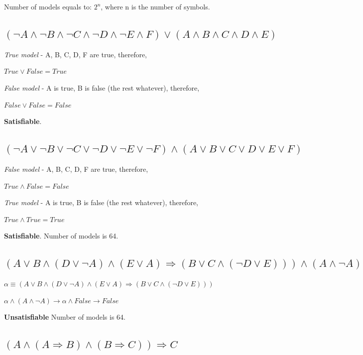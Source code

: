\documentclass{article}                     %
\newcommand{\nt}[1]{\neg #1}
\begin{document}
	Number of models equals to: $ 2^n $, where n is the number of symbols.
	
	\subsection{$ (\nt{A} \land \nt{B} \land \nt{C} \land \nt{D} \land \nt{E} \land F) \lor (A \land B \land C \land D \land E)$}
	\textit{True model} - A, B, C, D, F are true, therefore,
	
	$ True \lor False = True$
	
	\textit{False model} - A is true, B is false (the rest whatever), therefore,

	$ False \lor False = False $
	
	\textbf{Satisfiable}.
	\subsection{$ (\nt{A} \lor \nt{B} \lor \nt{C} \lor \nt{D} \lor \nt{E} \lor \nt{F}) \land (A \lor B \lor C \lor D \lor E \lor F)$}
	\textit{False model} - A, B, C, D, F are true, therefore,
	
	$ True \land False = False$
	
	\textit{True model} - A is true, B is false (the rest whatever), therefore,
	
	$ True \land True = True $
	
	\textbf{Satisfiable}. Number of models is 64.
	
	\subsection{$ (A \lor B \land (D \lor \nt{A}) \land (E \lor A) \Rightarrow  (B \lor C \land (\nt{D} \lor E))) \land (A \land \nt{A})$}
	
	$ \alpha \equiv (A \lor B \land (D \lor \nt{A}) \land (E \lor A) \Rightarrow  (B \lor C \land (\nt{D} \lor E))) $
	
	
	$ \alpha \land (A \land \nt{A}) \rightarrow \alpha \land False \rightarrow False $
	
	\textbf{Unsatisfiable}  Number of models is 64.
	
	\subsection{$ (A \land (A \Rightarrow B) \land (B \Rightarrow C)) \Rightarrow C $}
\end{document}

